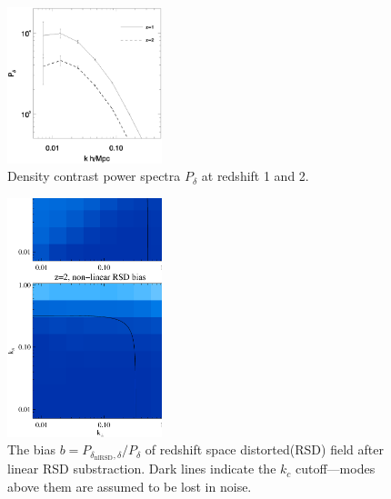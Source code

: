 \label{App:plots}

\begin{figure}%
\begin{center}
\includegraphics[width=0.4\textwidth]{z1z2powerden.eps}
\end{center}
\vspace{-0.7cm}
\caption{Density contrast power spectra $P_\delta$ at redshift 1 and 2.}
\label{fig:powerden}
\end{figure}

\begin{figure}%
\begin{center}
\includegraphics[width=0.4\textwidth]{compare_bias_rsdsub_z1z2.eps}
\end{center}
\vspace{-0.7cm}
\caption{The bias $b=P_{\delta_\mathrm{nlRSD},\delta}/P_{\delta}$ 
of redshift space distorted(RSD) field after linear RSD substraction.
Dark lines indicate the $k_c$ cutoff---modes above them are assumed to be lost in noise.}
\label{fig:bias}
\end{figure}

